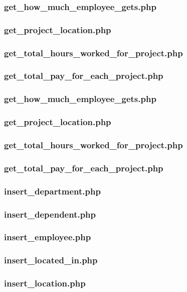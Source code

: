 \documentclass[11pt,letterpaper]{article}
\begin{document}
	\subsubsection{get\_how\_much\_employee\_gets.php}
	\subsubsection{get\_project\_location.php}
	\subsubsection{get\_total\_hours\_worked\_for\_project.php}
	\subsubsection{get\_total\_pay\_for\_each\_project.php}
	\subsubsection{get\_how\_much\_employee\_gets.php}
	\subsubsection{get\_project\_location.php}
	\subsubsection{get\_total\_hours\_worked\_for\_project.php}
	\subsubsection{get\_total\_pay\_for\_each\_project.php}
	\subsubsection{insert\_department.php}
	\subsubsection{insert\_dependent.php}
	\subsubsection{insert\_employee.php}
	\subsubsection{insert\_located\_in.php}
	\subsubsection{insert\_location.php}
\end{document}
